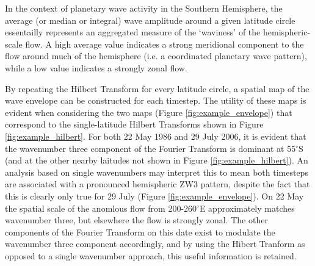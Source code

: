 In the context of planetary wave activity in the Southern Hemisphere, the average (or median or integral) wave amplitude around a given latitude circle essentailly represents an aggregated measure of the `waviness' of the hemispheric-scale flow. A high average value indicates a strong meridional component to the flow around much of the hemisphere (i.e. a coordinated planetary wave pattern), while a low value indicates a strongly zonal flow. 

By repeating the Hilbert Transform for every latitude circle, a spatial map of the wave envelope can be constructed for each timestep. The utility of these maps is evident when considering the two maps (Figure \ref{fig:example_envelope}) that correspond to the single-latitude Hilbert Transforms shown in Figure \ref{fig:example_hilbert}. For both 22 May 1986 and 29 July 2006, it is evident that the wavenumber three component of the Fourier Transform is dominant at 55$^{\circ}$S (and at the other nearby laitudes not shown in Figure \ref{fig:example_hilbert}). An analysis based on single wavenumbers may interpret this to mean both timesteps are associated with a pronounced hemispheric ZW3 pattern, despite the fact that this is clearly only true for 29 July (Figure \ref{fig:example_envelope}). On 22 May the spatial scale of the anomlous flow from 200-260$^{\circ}$E approximately matches wavenumber three, but elsewhere the flow is strongly zonal. The other components of the Fourier Transform on this date exist to modulate the wavenumber three component accordingly, and by using the Hibert Tranform as opposed to a single wavenumber approach, this useful information is retained.

